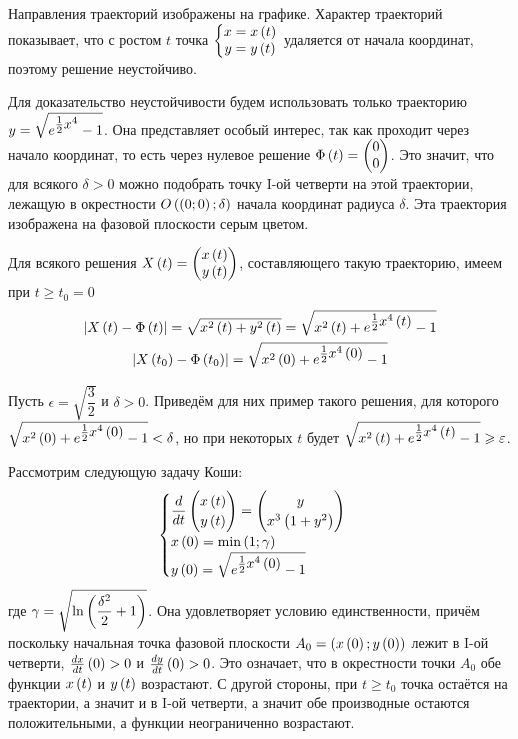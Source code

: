 \documentclass[a5paper,10pt]{article}
\begin{document}
Направления траекторий изображены на графике. Характер траекторий показывает, что с ростом $t$ точка
$\left\{ \begin{matrix} x = x\left(t\right) \\ y = y\left(t\right)\end{matrix} \right.$
удаляется от начала координат, поэтому решение неустойчиво.

Для доказательство неустойчивости будем использовать только траекторию $y = \sqrt{\tpow{e}{\frac {1}{2} x^4} - 1}$. \linebreak Она представляет особый интерес, так как проходит через начало координат, то есть через нулевое решение
$\Phi\left(t\right) = \begin{pmatrix}0 \\ 0 \end{pmatrix}$. Это значит, что для всякого $\delta > 0$ можно подобрать точку I-ой четверти на этой траектории, лежащую в окрестности $O\left(\left(0; 0\right); \delta\right)$ начала координат радиуса $\delta$. Эта траектория изображена на фазовой плоскости серым цветом.

Для всякого решения $X\left(t\right) = \begin{pmatrix} x\left(t\right) \\ y\left(t\right) \end{pmatrix}$, составляющего такую траекторию, имеем при $t \ge t_{0} = 0$
\begin{gather*}
\vbr{X\br{t} - \Phi\br{t}} 
= \sqrt{x^2\br{t} + y^2\br{t}} 
= \sqrt{x^2\br{t} + \tpow{e}{\frac {1}{2} x^4\br{t}} - 1} \\
\vbr{X\br{t_{0}} - \Phi\br{t_{0}}} = \sqrt{x^2\br{0} + \tpow{e}{\frac {1}{2} x^4\br{0}} - 1}
\end{gather*}

Пусть $\epsilon = \sqrt{\dfrac {3} {2}}$ и $\delta > 0$. Приведём для них пример такого решения, для которого $\sqrt{x^2\br{0} + \tpow{e}{\frac {1}{2} x^4\br{0}} - 1} < \delta$, но при некоторых $t$ будет $\sqrt{x^2\br{t} + \tpow{e}{\frac {1}{2} x^4\br{t}} - 1} \ge \epsilon$. 

Рассмотрим следующую задачу Коши:
$$\begin{cases}
\dfrac {d} {dt} \begin{pmatrix}x\br{t} \\ y\br{t}\end{pmatrix} = \begin{pmatrix} y \\  x^3 \br{1 + y^2} \end{pmatrix}\\
x\br{0} = \min\br{1; \gamma} \\
y\br{0} = \sqrt{ \tpow{e}{\frac {1}{2} x^{4}\br{0}} - 1}
\end{cases}$$
где $\gamma = \sqrt{\ln\left(\dfrac {\delta^2} {2} + 1\right)}$. Она удовлетворяет условию единственности, причём поскольку начальная точка фазовой плоскости $A_{0} = \left(x\left(0\right); y\left(0\right)\right)$ лежит в I-ой четверти, $\frac {dx} {dt}\left(0\right) > 0$ и $\frac {dy} {dt}\left(0\right) > 0$. Это означает, что в окрестности точки $A_{0}$ обе функции $x\left(t\right)$ и $y\left(t\right)$ возрастают. С другой стороны, при $t \ge t_{0}$ точка остаётся на траектории, а значит и в I-ой четверти, а значит обе производные остаются положительными, а функции неограниченно возрастают.
\end{document}
